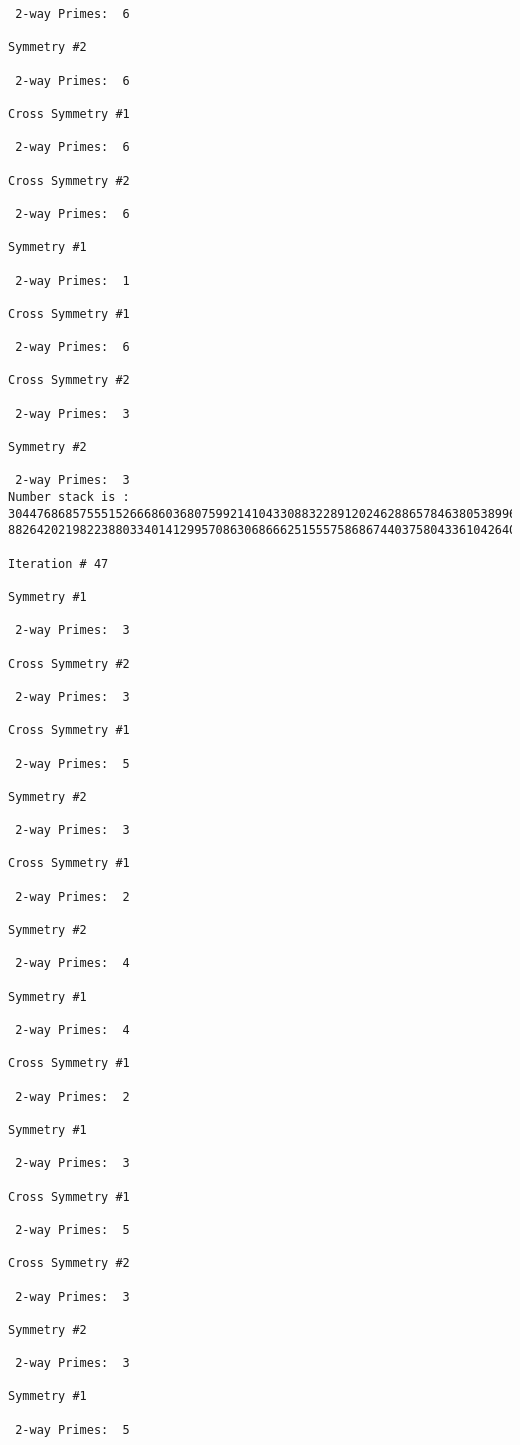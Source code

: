 {{{{\begin{verbatim}
 2-way Primes: 	6

Symmetry #2

 2-way Primes: 	6

Cross Symmetry #1

 2-way Primes: 	6

Cross Symmetry #2

 2-way Primes: 	6

Symmetry #1

 2-way Primes: 	1

Cross Symmetry #1

 2-way Primes: 	6

Cross Symmetry #2

 2-way Primes: 	3

Symmetry #2

 2-way Primes: 	3
Number stack is :
30447686857555152666860368075992141043308832289120246288657846380538996794608835958544046240163340857
88264202198223880334014129957086306866625155575868674403758043361042640445859538806497699835083648756

Iteration #	47

Symmetry #1

 2-way Primes: 	3

Cross Symmetry #2

 2-way Primes: 	3

Cross Symmetry #1

 2-way Primes: 	5

Symmetry #2

 2-way Primes: 	3

Cross Symmetry #1

 2-way Primes: 	2

Symmetry #2

 2-way Primes: 	4

Symmetry #1

 2-way Primes: 	4

Cross Symmetry #1

 2-way Primes: 	2

Symmetry #1

 2-way Primes: 	3

Cross Symmetry #1

 2-way Primes: 	5

Cross Symmetry #2

 2-way Primes: 	3

Symmetry #2

 2-way Primes: 	3

Symmetry #1

 2-way Primes: 	5


\end{verbatim}}}}}
